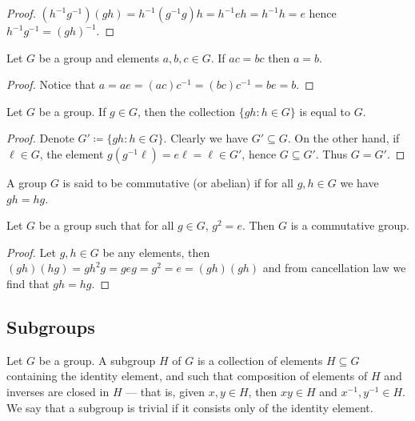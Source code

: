 \begin{proof}
    \((h^{-1} g^{-1})(g h) = h^{-1} (g^{-1} g) h = h^{-1} e h = h^{-1} h = e\)
    hence \(h^{-1} g^{-1} = (g h)^{-1}\).
\end{proof}

\begin{proposition}[Cancellation]
    Let \(G\) be a group and elements \(a, b, c \in G\). If \(a c = b c\) then
    \(a = b\).
\end{proposition}

\begin{proof}
    Notice that \(a = a e = (a c) c^{-1} = (b c) c^{-1} = b e = b\).
\end{proof}

\begin{proposition}
    Let \(G\) be a group. If \(g \in G\), then the collection \(\{g h \colon h \in G\}\)
    is equal to \(G\).
\end{proposition}

\begin{proof}
    Denote \(G' \coloneq \{g h \colon h \in G\}\). Clearly we have \(G' \subseteq G\). On the
    other hand, if \(\ell \in G\), the element \(g (g^{-1} \ell) = e \ell = \ell
    \in G'\), hence \(G \subseteq G'\). Thus \(G = G'\).
\end{proof}

\begin{definition}
    A group \(G\) is said to be commutative (or abelian) if for all \(g, h \in G\)
    we have \(g h = h g\).
\end{definition}

\begin{corollary}
    Let \(G\) be a group such that for all \(g \in G\), \(g^2 = e\). Then \(G\) is
    a commutative group.
\end{corollary}

\begin{proof}
    Let \(g, h \in G\) be any elements, then \((g h) (h g) = g h^2 g = g e g = g^2
    = e = (g h) (g h)\) and from cancellation law we find that \(g h = h g\).
\end{proof}

\subsection{Subgroups}

\begin{definition}[Subgroup]
    \label{def:subgroup}
    Let \(G\) be a group. A subgroup \(H\) of \(G\) is a collection of elements \(H
    \subseteq G\) containing the identity element, and such that composition of
    elements of \(H\) and inverses are closed in \(H\) --- that is, given \(x, y \in
    H\), then \(xy \in H\) and \(x^{-1}, y^{-1} \in H\). We say that a subgroup is
    trivial if it consists only of the identity element.
\end{definition}

